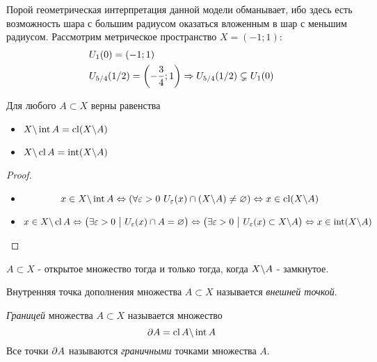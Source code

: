 \begin{example}
	Порой геометрическая интерпретация данной модели обманывает, ибо здесь есть возможность шара с большим радиусом оказаться вложенным в шар с меньшим радиусом. Рассмотрим метрическое пространство $X = (-1; 1)$:
	\begin{align*}
		&{U_{1}(0) = (-1; 1)}
		\\
		&{U_{5/4}(1/2) = \left(-\frac{3}{4}; 1\right) \Rightarrow U_{5/4}(1/2) \subsetneq U_{1}(0)}
	\end{align*}
\end{example}

\begin{lemma}
	Для любого $A \subset X$ верны равенства
	\begin{itemize}
		\item $X \backslash \operatorname{int} A = \operatorname{cl}(X \backslash A)$
		
		\item $X \backslash \operatorname{cl} A = \operatorname{int}(X \backslash A)$
	\end{itemize}
\end{lemma}

\begin{proof}~
	\begin{itemize}
		\item
		\[
			x \in X \backslash \operatorname{int} A \Leftrightarrow \left(\forall \varepsilon > 0\ U_\varepsilon(x) \cap (X \backslash A) \neq \varnothing\right) \Leftrightarrow x \in \operatorname{cl} (X \backslash A)
		\]
		
		\item
		\[
			x \in X \backslash \operatorname{cl} A \Leftrightarrow \left(\exists \varepsilon > 0 \ \big|\  U_\varepsilon(x) \cap A = \varnothing\right) \Leftrightarrow \left(\exists \varepsilon > 0 \ \big|\  U_\varepsilon(x) \subset X \backslash A\right) \Leftrightarrow x \in \operatorname{int} (X \backslash A)
		\]
	\end{itemize}
\end{proof}

\begin{corollary}
	$A \subset X$ - открытое множество тогда и только тогда, когда $X \backslash A$ - замкнутое.
\end{corollary}

\begin{definition}
	Внутренняя точка дополнения множества $A \subset X$ называется \textit{внешней точкой}.
\end{definition}

\begin{definition}
	\textit{Границей} множества $A \subset X$ называется множество
	\[
		\partial A = \operatorname{cl} A \backslash \operatorname{int} A
	\]
	Все точки $\partial A$ называются \textit{граничными} точками множества $A$.
\end{definition}


